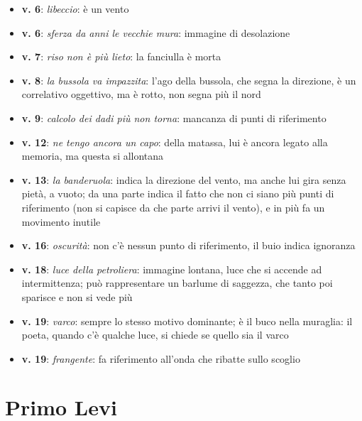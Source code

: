 \documentclass[a4paper, twoside, titlepage]{book}
\newcommand{\elenco}[1]{%
\begin{itemize}
#1
\end{itemize}}
\begin{document}
\elenco{\item \textbf{v. 6}: \textit{libeccio}: è un vento\item \textbf{v. 6}: \textit{sferza da anni le vecchie mura}: immagine di desolazione\item \textbf{v. 7}: \textit{riso non è più lieto}: la fanciulla è morta\item \textbf{v. 8}: \textit{la bussola va impazzita}: l'ago della bussola, che segna la direzione, è un correlativo oggettivo, ma è rotto, non segna più il nord\item \textbf{v. 9}: \textit{calcolo dei dadi più non torna}: mancanza di punti di riferimento\item \textbf{v. 12}: \textit{ne tengo ancora un capo}: della matassa, lui è ancora legato alla memoria, ma questa si allontana\item \textbf{v. 13}: \textit{la banderuola}: indica la direzione del vento, ma anche lui gira senza pietà, a vuoto; da una parte indica il fatto che non ci siano più punti di riferimento (non si capisce da che parte arrivi il vento), e in più fa un movimento inutile \item \textbf{v. 16}: \textit{oscurità}: non c'è nessun punto di riferimento, il buio indica ignoranza\item \textbf{v. 18}: \textit{luce della petroliera}: immagine lontana, luce che si accende ad intermittenza; può rappresentare un barlume di saggezza, che tanto poi sparisce e non si vede più\item \textbf{v. 19}: \textit{varco}: sempre lo stesso motivo dominante; è il buco nella muraglia: il poeta, quando c'è qualche luce, si chiede se quello sia il varco\item \textbf{v. 19}: \textit{frangente}: fa riferimento all'onda che ribatte sullo scoglio}

\chapter{Primo Levi}
\end{document}
